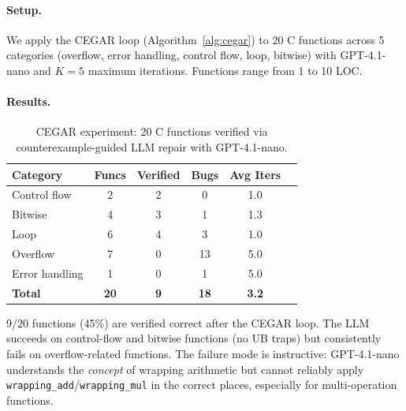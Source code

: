 \documentclass[11pt,a4paper]{article}
\begin{document}
\paragraph{Setup.}
We apply the CEGAR loop (Algorithm~\ref{alg:cegar}) to 20 C functions
across 5 categories (overflow, error handling, control flow, loop, bitwise)
with GPT-4.1-nano and $K=5$ maximum iterations.  Functions range from
1 to 10 LOC.

\paragraph{Results.}

\begin{table}[t]
\centering
\small
\caption{CEGAR experiment: 20 C functions verified via counterexample-guided
LLM repair with GPT-4.1-nano.}
\label{tab:cegar}
\begin{tabular}{@{}lccccc@{}}
\toprule
Category & Funcs & Verified & Bugs & Avg Iters \\
\midrule
Control flow & 2 & 2 & 0 & 1.0 \\
Bitwise      & 4 & 3 & 1 & 1.3 \\
Loop         & 6 & 4 & 3 & 1.0 \\
Overflow     & 7 & 0 & 13 & 5.0 \\
Error handling & 1 & 0 & 1 & 5.0 \\
\midrule
\textbf{Total} & \textbf{20} & \textbf{9} & \textbf{18} & \textbf{3.2} \\
\bottomrule
\end{tabular}
\end{table}

9/20 functions (45\%) are verified correct after the CEGAR loop.
The LLM succeeds on control-flow and bitwise functions (no UB traps)
but consistently fails on overflow-related functions.  The failure
mode is instructive: GPT-4.1-nano understands the \emph{concept} of
wrapping arithmetic but cannot reliably apply \texttt{wrapping\_add}/\texttt{wrapping\_mul} in the correct places, especially for multi-operation functions.
\end{document}
